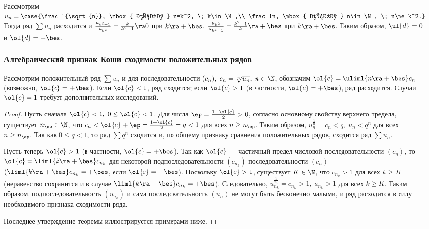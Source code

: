 \documentclass[a4paper]{article}
\begin{document}
\begin{ex}
Рассмотрим $u_n = \case{\frac1{\sqrt{n}}, \mbox{ если } n=k^2, \;
k\in\N,\\ \frac1n, \mbox{ если } n\in\N, \; n\ne k^2.}$ Тогда ряд
$\sum u_n$ расходится и $\frac{u_{k^2+1}}{u_{k^2}} =
\frac{k}{k^2+1}\ra0$ при $k\ra+\bes$, $\frac{u_{k^2}}{u_{k^2-1}} =
\frac{k^2-1}{k} \ra +\bes$ при $k\ra+\bes$. Таким образом,
$\ul{d}=0$ и $\ol{d}=+\bes$.
\end{ex}

\subsubsection{Алгебраический признак Коши сходимости положительных
рядов}

\begin{theorem}
Рассмотрим положительный ряд $\sum u_n$ и для последовательности
$(c_n), \; c_n=\sqrt[n]{u_n}, \; n\in\N$, обозначим
$\ol{c}=\uliml{n\ra+\bes}c_n$ (возможно, $\ol{c}=+\bes$). Если
$\ol{c}<1$, ряд сходится; если $\ol{c}>1$ (в частности,
$\ol{c}=+\bes$), ряд расходится. Случай $\ol{c}=1$ требует
дополнительных исследований.
\end{theorem}

\begin{proof}
Пусть сначала $\ol{c}<1, \; 0\le\ol{c}<1$. Для числа $\ep =
\frac{1-\ol{c}}2>0$, согласно основному свойству верхнего предела,
существует $n_{\ep}\in\N$, что $c_n < \ol{c} + \ep =
\frac{1+\ol{c}}2 = q < 1$ для всех $n\ge n_{\ep}$. Таким образом,
$u^{\frac1n}_n = c_n < q, \; u_n<q^n$ для всех $n\ge n_{\ep}$. Так
как $0\le q < 1$, то ряд $\sum q^n$ сходится и, по общему признаку
сравнения положительных рядов, сходится ряд $\sum u_n$.

Пусть теперь $\ol{c}>1$ (в частности, $\ol{c}=+\bes$). Так как
$\ol{c}$ --- частичный предел числовой последовательности $(c_n)$,
то $\ol{c} = \liml{k\ra+\bes} c_{n_k}$ для некоторой
подпоследовательности $(c_{n_k})$ последовательности $(c_n)$
$(\liml{k\ra+\bes} c_{n_k} = +\bes$, если $\ol{c}=+\bes$). Поскольку
$\ol{c}>1$, существует $K\in\N$, что $c_{n_k}>1$ для всех $k\ge K$
(неравенство сохранится и в случае $\liml{k\ra+\bes} c_{n_k} =
+\bes$). Следовательно, $u^{\frac1{n_k}}_{n_k} = c_{n_k} > 1, \;
u_{n_k} > 1$ для всех $k\ge K$. Таким образом, подпоследовательность
$(u_{n_k})$ и сама последовательность $(u_n)$ не могут быть
бесконечно малыми, и ряд расходится в силу необходимого признака
сходимости ряда.

Последнее утверждение теоремы иллюстрируется примерами ниже.
\end{proof}
\end{document}
